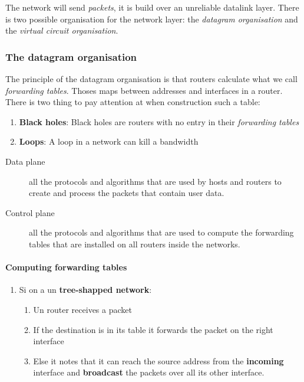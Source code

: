 The network will send \textit{packets}, it is build over an unreliable datalink layer. There is two possible organisation for the network layer: the \textit{datagram organisation} and the \textit{virtual circuit organisation}.

\subsubsection{The datagram organisation}

The principle of the datagram organisation is that routers calculate what we call \textit{forwarding tables}. Thoses maps between addresses and interfaces in a router. There is two thing to pay attention at when construction such a table:

\begin{enumerate}
\item \textbf{Black holes}: Black holes are routers with no entry in their \textit{forwarding tables}
\item \textbf{Loops}: A loop in a network can kill a bandwidth
\end{enumerate}

\begin{description}
\item[Data plane] all the protocols and algorithms that are used by hosts and routers to create and process the packets that contain user data.
\item[Control plane] all the protocols and algorithms that are used to compute the forwarding tables that are installed on all routers inside the networks.
\end{description}

\paragraph{Computing forwarding tables}
\begin{enumerate}
    \item Si on a un \textbf{tree-shapped network}:
		\begin{enumerate}
			\item Un router receives a packet
			\item If the destination is in its table it forwards the packet on the right interface	
			\item Else it notes that it can reach the source address from the \textbf{incoming} interface and \textbf{broadcast} the packets over all its other interface.
		\end{enumerate}
	
\end{enumerate}

